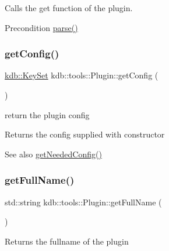Calls the get function of the plugin. 

\begin{DoxyPrecond}{Precondition}
\hyperlink{classkdb_1_1tools_1_1Plugin_adfcba2fbdeb436a1083410df804d5fb0}{parse()} 
\end{DoxyPrecond}
\mbox{\label{classkdb_1_1tools_1_1Plugin_af3004444f5ef05dc8106646ff2b95694}} 
\subsubsection{\texorpdfstring{get\+Config()}{getConfig()}}
{\footnotesize\ttfamily \hyperlink{classkdb_1_1KeySet}{kdb\+::\+Key\+Set} kdb\+::tools\+::\+Plugin\+::get\+Config (\begin{DoxyParamCaption}{ }\end{DoxyParamCaption})}



return the plugin config 

\begin{DoxyReturn}{Returns}
the config supplied with constructor 
\end{DoxyReturn}
\begin{DoxySeeAlso}{See also}
\hyperlink{classkdb_1_1tools_1_1Plugin_ad2a0a4a64d17c479e7cd8b1402275cc7}{get\+Needed\+Config()} 
\end{DoxySeeAlso}
\mbox{\label{classkdb_1_1tools_1_1Plugin_acbe982e7bbb71aafb49b0d632e8650c9}} 
\subsubsection{\texorpdfstring{get\+Full\+Name()}{getFullName()}}
{\footnotesize\ttfamily std\+::string kdb\+::tools\+::\+Plugin\+::get\+Full\+Name (\begin{DoxyParamCaption}{ }\end{DoxyParamCaption})}

\begin{DoxyReturn}{Returns}
the fullname of the plugin 
\end{DoxyReturn}
\mbox{\label{classkdb_1_1tools_1_1Plugin_aa4eac3b2b515104a0d595c717c546ec0}} 
